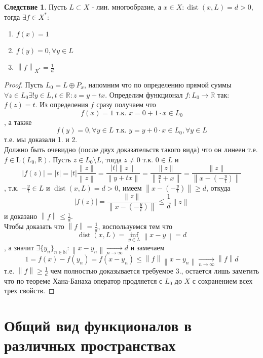 \documentclass[12pt,a4paper]{article}
\theoremstyle{definition}
\newtheorem{corollary}{Следствие}[theorem]
\newcommand{\Real}{\mathbb{R}}
\newcommand{\Natural}{\mathbb{N}}
\newcommand{\norm}[1]{\left\lVert#1\right\rVert}
\DeclareMathOperator{\dist}{dist}
\newcommand{\linear}[2]{\textrm{L}(#1, #2)}
\newcommand{\seq}[2]{\{#1\}_{#2}}
\begin{document}
\begin{corollary}
	Пусть $L\subset X$ - лин. многообразие, а $x\in X: \dist(x,L) = d > 0$, тогда $\exists f\in X^*$:
	\begin{enumerate}
		\item $f(x)=1$
		\item $f(y)=0,\forall y \in L$
		\item $\norm{f}_{X^*} = \frac{1}{d}$
	\end{enumerate}
\end{corollary}
\begin{proof}
	Пусть $L_0 = L \oplus P_{x}$, напомним что по определению прямой суммы $\forall z \in L_0 \exists!y\in L, t\in\Real: z = y + tx$. Определим функционал $f : L_0 \to \Real$ так: $f(z)=t$. Из определения $f$ сразу получаем что $$f(x)=1 \text{ т.к. } x = 0 + 1\cdot x \in L_0$$, а также $$f(y) = 0, \forall y \in L \text{ т.к. } y = y + 0\cdot x \in L_0, \forall y \in L$$ т.е. мы доказали 1. и 2. \\
	
	Должно быть очевидно (после двух доказательств такого вида) что он линеен т.е. $f\in\linear{L_0}{\Real}$. Пусть $z \in L_0 \setminus L$, тогда $z \neq 0$ т.к. $0\in L$ и 
	$$|f(z)| = |t| = 
	|t|\frac{\norm{z}}{\norm{z}} = 
	\frac{|t|\norm{z}}{\norm{y+tx}} =
	\frac{\norm{z}}{\norm{\frac{y}{t} + x}} = 
	\frac{\norm{z}}{\norm{x - (-\frac{y}{t})}}$$
	, т.к. $-\frac{y}{t} \in L$ и $\dist(x, L) = d > 0$, имеем $\norm{x - (-\frac{y}{t})} \geq d$, откуда
	$$|f(z)| = \frac{\norm{z}}{\norm{x - (-\frac{y}{t})}} \leq 
	\frac{1}{d}\norm{z}$$ и доказано $\norm{f} \leq \frac{1}{d}$. \\
	
	Чтобы доказать что $\norm{f} = \frac{1}{d}$, воспользуемся тем что $$\dist(x,L) = \inf_{y \in L}{\norm{x - y}} = d$$, а значит  $\exists\seq{y_n}{n\in\Natural}: \norm{x-y_n} \xrightarrow[n \to \infty]{} d$ и замечаем
	$$1 = f(x) - f(y_n) = f(x - y_n) \leq \norm{f}\norm{x - y_n} \xrightarrow[n \to \infty]{} \norm{f}d$$
	т.е. $\norm{f} \geq \frac{1}{d}$ чем полностью доказывается требуемое 3., остается лишь заметить что по теореме Хана-Банаха оператор продляется с $L_0$ до $X$ с сохранением всех трех свойств.
\end{proof}

\section{Общий вид функционалов в различных пространствах}
\end{document}
